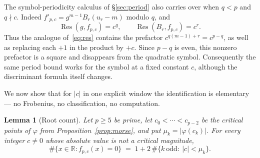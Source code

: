 \documentclass[11pt,a4paper]{amsart}
\newcommand{\R}{\mathbb{R}}
\newcommand{\Res}{\operatorname{Res}}
\theoremstyle{plain}
\newtheorem{lemma}[theorem]{Lemma}
\theoremstyle{definition}
\begin{document}
The symbol-periodicity calculus of \S\ref{sec:period} also carries over when \(q<p\) and \(q\nmid c\). Indeed \(f'_{p,c}=g^{m-1}B_r(u_r-m)\) modulo \(q\), and
\[
 \Res(g,f_{p,c})=c^q,\qquad \Res(B_r,f_{p,c})=c^r.
\]
Thus the analogue of~\eqref{eq:res} contains the prefactor \(c^{q(m-1)+r}=c^{p-q}\), as well as replacing each \(+1\) in the product by \(+c\). Since \(p-q\) is even, this nonzero prefactor is a square and disappears from the quadratic symbol. Consequently the same period bound works for the symbol at a fixed constant \(c\), although the discriminant formula itself changes.

We now show that for \(\lvert c\rvert\) in one explicit window the identification is elementary --- no Frobenius, no classification, no computation.

\begin{lemma}[Root count]
\label{lem:count}
Let \(p\ge5\) be prime, let \(c_0<\cdots<c_{p-2}\) be the critical points of \(\varphi\) from Proposition~\ref{prop:morse}, and put \(\mu_k=\lvert\varphi(c_k)\rvert\). For every integer \(c\ne0\) whose absolute value is not a critical magnitude,
\[
\#\{x\in\R:f_{p,c}(x)=0\}\;=\;1+2\,\#\{k\ \text{odd}:\ \lvert c\rvert<\mu_k\}.
\]
\end{lemma}
\end{document}
